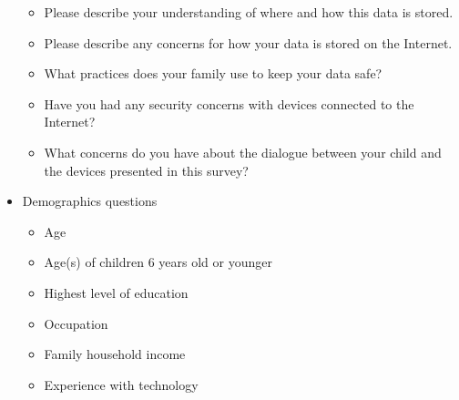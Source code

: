 \documentclass[12pt]{ucthesis}
\begin{document}
\begin{itemize}
\begin{itemize}
        \item Please describe your understanding of where and how this data is stored.
        \item Please describe any concerns for how your data is stored on the Internet.
        \item What practices does your family use to keep your data safe?
        \item Have you had any security concerns with devices connected to the Internet?
        \item What concerns do you have about the dialogue between your child and the devices presented in this survey?
    \end{itemize}
    \item Demographics questions
    \begin{itemize}
        \item Age 
        \item Age(s) of children 6 years old or younger
        \item Highest level of education
        \item Occupation
        \item Family household income
        \item Experience with technology
    \end{itemize}
  \end{itemize}
\end{document}
